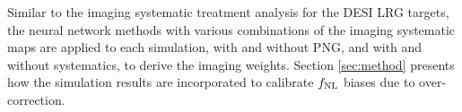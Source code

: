 Similar to the imaging systematic treatment analysis for the DESI LRG targets, the neural network methods with various combinations of the imaging systematic maps are applied to each simulation, with and without PNG, and with and without systematics, to derive the imaging weights. Section \ref{sec:method} presents how the simulation results are incorporated to calibrate $f_{\rm NL}$ biases due to over-correction. 